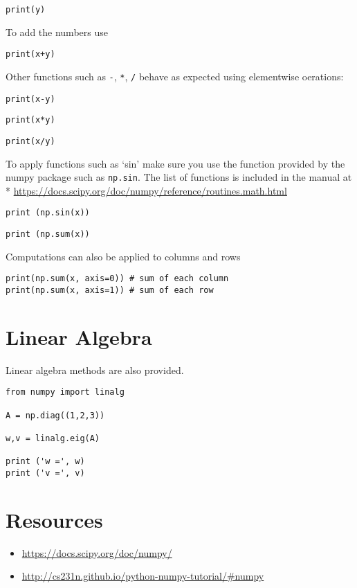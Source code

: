 \begin{verbatim}
print(y)
\end{verbatim}

To add the numbers use

\begin{verbatim}
print(x+y)
\end{verbatim}

Other functions such as \texttt{-}, \texttt{*}, \texttt{/} behave as
expected using elementwise oerations:

\begin{verbatim}
print(x-y)
\end{verbatim}

\begin{verbatim}
print(x*y)
\end{verbatim}

\begin{verbatim}
print(x/y)
\end{verbatim}

To apply functions such as `sin' make sure you use the function provided
by the numpy package such as \texttt{np.sin}. The list of functions is
included in the manual at *
\url{https://docs.scipy.org/doc/numpy/reference/routines.math.html}

\begin{verbatim}
print (np.sin(x))
\end{verbatim}

\begin{verbatim}
print (np.sum(x))
\end{verbatim}

Computations can also be applied to columns and rows

\begin{verbatim}
print(np.sum(x, axis=0)) # sum of each column
print(np.sum(x, axis=1)) # sum of each row
\end{verbatim}

\section{Linear Algebra}\label{linear-algebra}

Linear algebra methods are also provided.

\begin{verbatim}
from numpy import linalg 

A = np.diag((1,2,3))

w,v = linalg.eig(A)

print ('w =', w)
print ('v =', v)
\end{verbatim}

\section{Resources}\label{resources}

\begin{itemize}
\tightlist
\item
  \url{https://docs.scipy.org/doc/numpy/}
\item
  \url{http://cs231n.github.io/python-numpy-tutorial/\#numpy}
\end{itemize}
